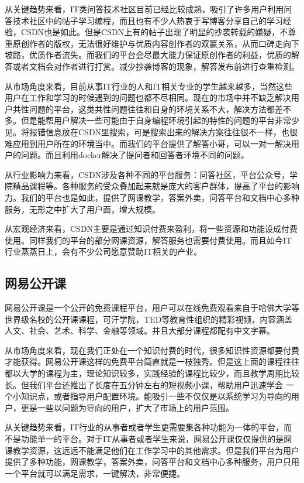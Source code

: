 \documentclass[a4paper]{ctexart}
\begin{document}
从关键趋势来看，IT类问答技术社区目前已经比较成熟，吸引了许多用户利用问答技术社区中的帖子学习编程，而且也有不少人热衷于写博客分享自己的学习经验，CSDN也是如此。但是CSDN上有的帖子出现了明显的抄袭转载的嫌疑，不尊重原创作者的版权，无法很好维护与优质内容创作者的双赢关系，从而口碑走向下坡路，优质作者流失。而我们的平台会尽最大能力保证原创作者的利益，优质的解答或者文档会对作者进行打赏。减少抄袭博客的现象，解答发布前进行查重检测。

从市场角度来看，目前从事IT行业的人和IT相关专业的学生越来越多，当然这些用户在工作和学习的时候遇到的问题也都不尽相同。现在的市场中并不缺乏解决用户共性问题的平台，这类共性问题往往和自身的环境关系不大，解决方法都差不多。但是能帮用户解决一些可能由于自身编程环境引起的特性的问题的平台非常少见。将报错信息放在CSDN里搜索，可是搜索出来的解决方案往往很不一样，也很难应用到用户所在的环境当中。而我们的平台提供了解答小哥，可以一对一解决用户的问题。而且利用docker解决了提问者和回答者环境不同的问题。

从行业影响力来看，CSDN涉及各种不同的平台服务：问答社区，平台公众号，学院精品课程等。各种服务的受众叠加起来就是庞大的客户群体，提高了平台的影响力。我们的平台也是如此，提供了网课教学，答案外卖，问答平台和文档中心多种服务，无形之中扩大了用户面，增大规模。

从宏观经济来看，CSDN主要是通过知识付费来盈利，将一些资源和功能设成付费使用。同样我们的平台的部分网课资源，解答服务也需要付费使用。而且如今IT行业蒸蒸日上，会有不少公司愿意赞助IT相关的产业。


\subsection{网易公开课}
网易公开课是一个公开的免费课程平台，用户可以在线免费观看来自于哈佛大学等世界级名校的公开课课程，可汗学院，TED等教育性组织的精彩视频，内容涵盖人文、社会、艺术、科学、金融等领域。并且大部分课程都配有中文字幕。

从市场角度来看，现在我们正处在一个知识付费的时代，很多知识性资源都要付费才能获得。网易公开课这样的免费平台简直就是一枝独秀。但是这上面的课程往往都以大学的课程为主，理论知识较多，实践经验的课程比较少，而且教学周期比较长。但我们平台还推出了长度在五分钟左右的短视频小课，帮助用户迅速学会 一个小知识点，或者指导用户配置环境。能吸引一些不仅仅是以系统学习为导向的用户，更是一些以问题为导向的用户，扩大了市场上的用户范围。

从关键趋势来看，IT行业的从事者或者学生更需要集各种功能为一体的平台，而不是功能单一的平台。对于IT从事者或者学生来说，网易公开课仅仅提供的是网课教学资源，这远远不能满足他们在工作学习中的其他需求。但是我们平台为用户提供了多种功能，网课教学，答案外卖，问答平台和文档中心多种服务，用户只用一个平台就可以满足需求，一键解决，非常便捷。
\end{document}
